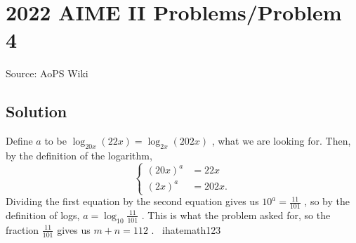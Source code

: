 \documentclass[12pt]{article}
\begin{document}
\section*{{2022 AIME II Problems/Problem 4}}
Source: AoPS Wiki

\subsection*{Solution}
Define $a$ to be $\log_{20x} (22x) = \log_{2x} (202x)$ , what we are looking for. Then, by the definition of the logarithm, \[\begin{cases} (20x)^{a} &= 22x \\ (2x)^{a} &= 202x. \end{cases}\] Dividing the first equation by the second equation gives us $10^a = \frac{11}{101}$ , so by the definition of logs, $a = \log_{10} \frac{11}{101}$ . This is what the problem asked for, so the fraction $\frac{11}{101}$ gives us $m+n = \boxed{112}$ . ~ihatemath123
\end{document}
